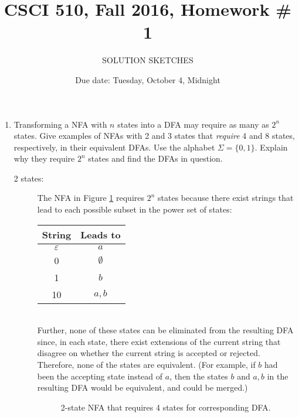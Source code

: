 \documentclass{article}
\title{CSCI 510, Fall 2016, Homework \# 1}
\author{SOLUTION SKETCHES}
\date{Due date: Tuesday, October 4, Midnight}
\begin{document}
\maketitle
\begin{enumerate}
\item Transforming a NFA with $n$ states into a DFA may require as
  many as $2^n$ states.  Give examples of NFAs with 2 and 3 states
  that {\em require} 4 and 8 states, respectively, in their
  equivalent DFAs. Use the alphabet $\Sigma=\{0,1\}$.  Explain why
  they require $2^n$ states and find the DFAs in question.

  \begin{description}
  \item[2 states:] The NFA in Figure \ref{nfatwo} requires $2^n$
    states because there exist strings that lead to each possible
    subset in the power set of states:
    \\
    \begin{tabular}{cc}
      String & Leads to\\\hline
      $\varepsilon$ & $a$\\
      0 & $\emptyset$ \\
      1 & $b$\\
      10 & $a,b$
    \end{tabular}\\
    Further, none of these states can be eliminated from the resulting
    DFA since, in each state, there exist extensions of the current
    string that disagree on whether the current string is accepted or
    rejected. Therefore, none of the states are equivalent.  (For
    example, if $b$ had been the accepting state instead of $a$, then
    the states $b$ and $a,b$ in the resulting DFA would be equivalent,
    and could be merged.)

  \begin{figure}[!htbp]
    \begin{center}
    \end{center}
    \caption{2-state NFA that requires 4 states for corresponding DFA.}
    \label{nfatwo}
  \end{figure}
  

\end{description}
\end{enumerate}
\end{document}
